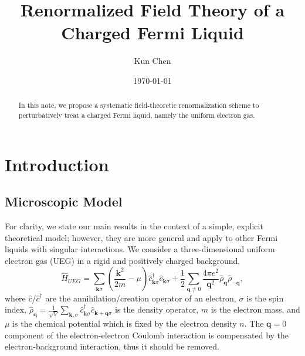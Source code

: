 \documentclass[reprint,amsmath,amssymb,aps,prb]{revtex4-1}
\begin{document}
\newcommand{\red}[1]{\textcolor{red}{#1}}


\newcommand{\bk}{\mathbf{k}}
\newcommand{\bq}{\mathbf{q}}
\newcommand{\mL}{\mathcal{L}}
\newcommand{\bpsi}{\bar\psi}

\title{Renormalized Field Theory of a Charged Fermi Liquid}
\author{Kun Chen}
\date{\today}

\begin{abstract}
    In this note, we propose a systematic field-theoretic renormalization scheme to perturbatively treat a charged Fermi liquid, namely the uniform electron gas.
\end{abstract}

\maketitle

\tableofcontents
\section{Introduction}

\subsection{Microscopic Model}

For clarity, we state our main results in the context of a simple, explicit theoretical model; however, they are more general and apply to other Fermi liquids with singular interactions. We consider a three-dimensional uniform electron gas (UEG) in a rigid and positively charged background,
\begin{equation}
    \label{eq:jellium}
    \hat{H}_{\textit{UEG}} =\sum_{\mathbf{k} \sigma}\left(\frac{\mathbf{k}^{2}}{2m}-\mu\right) \hat{c}_{\mathbf{k} \sigma}^{\dagger} \hat{c}_{\mathbf{k} \sigma} +\frac{1}{2} \sum_{\bq \neq 0} \frac{4\pi e^2}{\bq^2}\hat{\rho}_{\bq}\hat{\rho}_{-\bq},
\end{equation}
where $\hat{c}$/$\hat{c}^\dagger$ are the annihilation/creation operator of an electron, $\sigma$ is the spin index, $\hat{\rho}_{\bq}=\frac{1}{\sqrt{V}}\sum_{\bk,\sigma} \hat{c}^\dag_{\bk \sigma} \hat{c}_{\bk+\bq \sigma}$ is the density operator, $m$ is the electron mass, and $\mu$ is the chemical potential which is fixed by the electron density $n$. The $\bq=0$ component of the electron-electron Coulomb interaction is compensated by the electron-background interaction, thus it should be removed.
\end{document}
